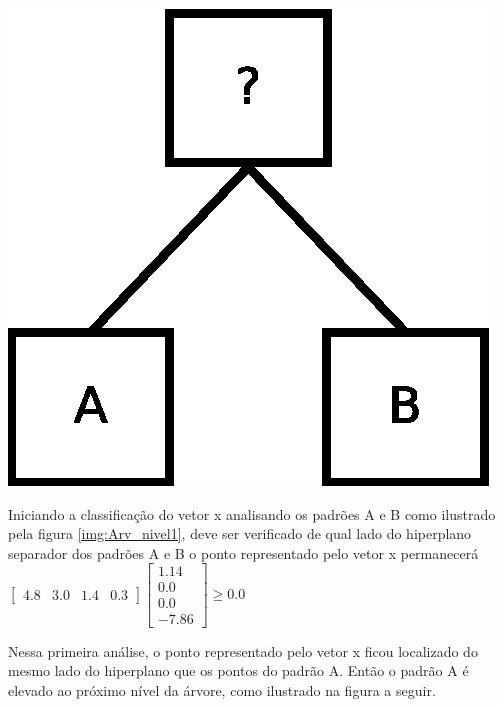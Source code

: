 \begin{center}
	\includegraphics[scale=0.4]{graficos/arvore_nivel1}
	\label{img:Arv_nivel1}
\end{center}

Iniciando a classificação do vetor x analisando os padrões A e B como ilustrado pela figura \ref{img:Arv_nivel1}, deve ser verificado de qual lado do hiperplano separador dos padrões A e B o ponto representado pelo vetor x permanecerá
$ \begin{bmatrix}
4.8 & 3.0 & 1.4 & 0.3 
\end{bmatrix}
\begin{bmatrix}
1.14
\\ 
0.0
\\
0.0 
\\
-7.86 
\end{bmatrix}
\geq  0.0 $ 

Nessa primeira análise, o ponto representado pelo vetor x ficou localizado do mesmo lado do hiperplano que os pontos do padrão A. Então o padrão A é elevado ao próximo nível da árvore, como ilustrado na figura a seguir.

